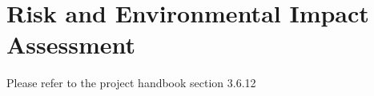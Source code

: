 \section*{Risk and Environmental Impact Assessment}

Please refer to the project handbook section 3.6.12

